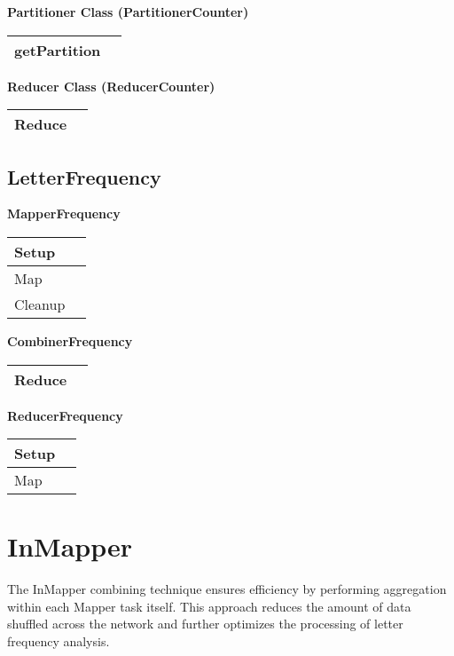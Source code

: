 \textbf{Partitioner Class (PartitionerCounter)}
\begin{longtable}{|>{\raggedright\arraybackslash}p{}|>{\raggedright\arraybackslash}p{}|}
    \hline
    getPartition &  \\
    \hline
\end{longtable}

\textbf{Reducer Class (ReducerCounter)}
\begin{longtable}{|>{\raggedright\arraybackslash}p{}|>{\raggedright\arraybackslash}p{}|}
    \hline
    Reduce &  \\
    \hline
\end{longtable}



\subsection{LetterFrequency}

\textbf{MapperFrequency}
\begin{longtable}{|>{\raggedright\arraybackslash}p{}|>{\raggedright\arraybackslash}p{}|}
    \hline
    Setup &  \\
    \hline
    Map & \\
    \hline
    Cleanup & \\
    \hline
\end{longtable}


\textbf{CombinerFrequency}
\begin{longtable}{|>{\raggedright\arraybackslash}p{}|>{\raggedright\arraybackslash}p{}|}
    \hline
    Reduce & \\
    \hline
\end{longtable}

\textbf{ReducerFrequency}
\begin{longtable}{|>{\raggedright\arraybackslash}p{}|>{\raggedright\arraybackslash}p{}|}
    \hline
    Setup &  \\
    \hline
    Map & \\
    \hline
\end{longtable}



\section{InMapper}
The InMapper combining technique ensures efficiency by performing aggregation within each Mapper task itself. This approach reduces the amount of data shuffled across the network and further optimizes the processing of letter frequency analysis.


